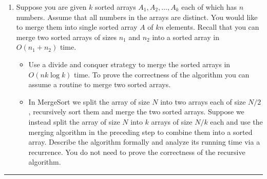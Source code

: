 \documentclass[11pt]{article}
\begin{document}


\begin{enumerate}[2.]
\item Suppose you are given $k$ sorted arrays $A_1,A_2,\ldots,A_k$
  each of which has $n$ numbers. Assume that all numbers in the arrays
  are distinct. You would like to merge them into single sorted array
  $A$ of $kn$ elements. Recall that you can merge two sorted arrays of
  sizes $n_1$ and $n_2$ into a sorted array in $O(n_1+n_2)$ time.
  \begin{itemize}
  \item Use a divide and conquer strategy to merge the sorted arrays
    in $O(nk \log k)$ time. To prove the correctness of the algorithm
    you can assume a routine to merge two sorted arrays.
  \item In MergeSort we split the array of size $N$ into two arrays
    each of size $N/2$, recursively sort them and merge the two sorted
    arrays. Suppose we instead split the array of size $N$ into $k$
    arrays of size $N/k$ each and use the merging algorithm in the
    preceding step to combine them into a sorted array.  Describe the
    algorithm formally and analyze its running time via a recurrence.
    You do not need to prove the correctness of the recursive algorithm.
  \end{itemize}
\end{enumerate}

\hrule
\end{document}
